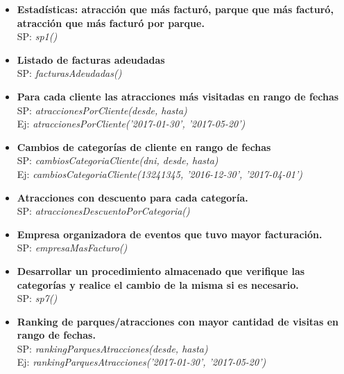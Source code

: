 \begin{itemize}
  \item \textbf{Estadísticas: atracción que más facturó, parque que más facturó, atracción que más facturó por parque.} \\
  SP: \textit{sp1()}
  \item \textbf{Listado de facturas adeudadas} \\
  SP: \textit{facturasAdeudadas()}
  \item \textbf{Para cada cliente las atracciones más visitadas en rango de fechas} \\
  SP: \textit{atraccionesPorCliente(desde, hasta)} \\
  Ej: \textit{atraccionesPorCliente('2017-01-30', '2017-05-20')}
  \item \textbf{Cambios de categorías de cliente en rango de fechas} \\
  SP: \textit{cambiosCategoriaCliente(dni, desde, hasta)} \\
  Ej: \textit{cambiosCategoriaCliente(13241345, '2016-12-30', '2017-04-01')}
  \item \textbf{Atracciones con descuento para cada categoría.} \\
  SP: \textit{atraccionesDescuentoPorCategoria()}
  \item \textbf{Empresa organizadora de eventos que tuvo mayor facturación.} \\
  SP: \textit{empresaMasFacturo()}
  \item \textbf{Desarrollar un procedimiento almacenado que verifique las categorías y realice el cambio de la misma si es necesario.} \\
  SP: \textit{sp7()}
  \item \textbf{Ranking de parques/atracciones con mayor cantidad de visitas en rango de fechas.} \\
  SP: \textit{rankingParquesAtracciones(desde, hasta)} \\
  Ej: \textit{rankingParquesAtracciones('2017-01-30', '2017-05-20')} \\
\end{itemize}

